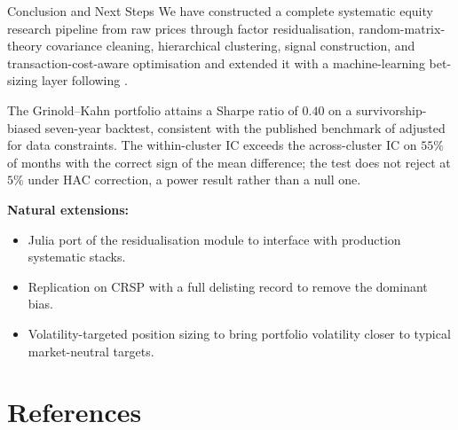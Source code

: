 \documentclass[10pt,aspectratio=169]{beamer}
\begin{document}
\begin{frame}{Conclusion and Next Steps}
  \small
  We have constructed a complete systematic equity research pipeline from raw prices through factor residualisation, random-matrix-theory covariance cleaning, hierarchical clustering, signal construction, and transaction-cost-aware optimisation and extended it with a machine-learning bet-sizing layer following \cite{lopezdeprado2018}.

  \medskip

  The Grinold--Kahn portfolio attains a Sharpe ratio of $0.40$ on a survivorship-biased seven-year backtest, consistent with the published benchmark of \cite{blitz2017} adjusted for data constraints. The within-cluster IC exceeds the across-cluster IC on $55\%$ of months with the correct sign of the mean difference; the test does not reject at $5\%$ under HAC correction, a power result rather than a null one.

  \medskip
  \textbf{Natural extensions:}
  \begin{itemize}\setlength{\itemsep}{1pt}
    \item Julia port of the residualisation module to interface with production systematic stacks.
    \item Replication on CRSP with a full delisting record to remove the dominant bias.
    \item Volatility-targeted position sizing to bring portfolio volatility closer to typical market-neutral targets.
  \end{itemize}
\end{frame}

\section*{References}
\end{document}
